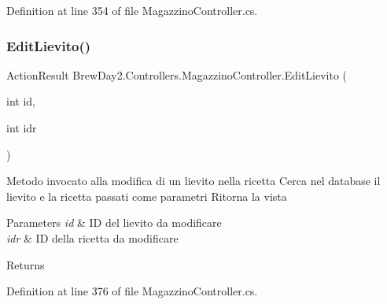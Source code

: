 Definition at line 354 of file Magazzino\+Controller.\+cs.

\mbox{\label{class_brew_day2_1_1_controllers_1_1_magazzino_controller_a50bd39377dbd3b58301360246e211a05}} 
\subsubsection{\texorpdfstring{Edit\+Lievito()}{EditLievito()}\hspace{0.1cm}{\footnotesize\ttfamily [1/2]}}
{\footnotesize\ttfamily Action\+Result Brew\+Day2.\+Controllers.\+Magazzino\+Controller.\+Edit\+Lievito (\begin{DoxyParamCaption}\item[{int}]{id,  }\item[{int}]{idr }\end{DoxyParamCaption})}



Metodo invocato alla modifica di un lievito nella ricetta Cerca nel database il lievito e la ricetta passati come parametri Ritorna la vista 


\begin{DoxyParams}{Parameters}
{\em id} & ID del lievito da modificare\\
\hline
{\em idr} & ID della ricetta da modificare\\
\hline
\end{DoxyParams}
\begin{DoxyReturn}{Returns}

\end{DoxyReturn}


Definition at line 376 of file Magazzino\+Controller.\+cs.

\mbox{\label{class_brew_day2_1_1_controllers_1_1_magazzino_controller_a77226fc3fd21b9965da8c4477951f375}} 
